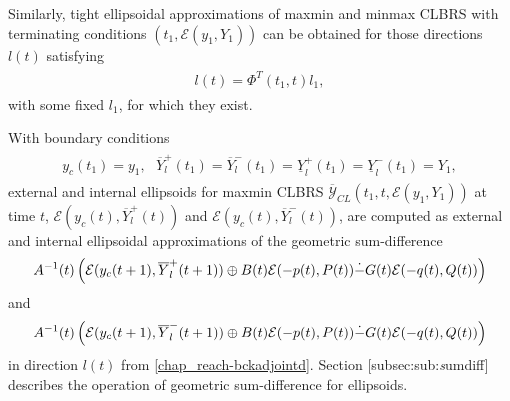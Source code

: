 \documentclass[letterpaper,10pt,english]{sphinxmanual}
\begin{document}
Similarly, tight ellipsoidal approximations of maxmin and minmax CLBRS
with terminating conditions $(t_1, {\mathcal E}(y_1,Y_1))$ can be
obtained for those directions $l(t)$ satisfying
\label{chap_reach:equation-bckadjointd}\begin{gather}
\begin{split}l(t) = \Phi^T(t_1,t)l_1,\end{split}\label{chap_reach-bckadjointd}
\end{gather}
with some fixed $l_1$, for which they exist.

With boundary conditions
\label{chap_reach:equation-bndconds}\begin{gather}
\begin{split}y_c(t_1)=y_1, ~~~ \overline{Y}^+_l(t_1)=\overline{Y}^-_l(t_1)=\underline{Y}^+_l(t_1)=\underline{Y}^-_l(t_1)=Y_1,\end{split}\label{chap_reach-bndconds}
\end{gather}
external and internal ellipsoids for maxmin CLBRS
$\overline{{\mathcal Y}}_{CL}(t_1,t,{\mathcal E}(y_1,Y_1))$ at
time $t$, ${\mathcal E}(y_c(t),\overline{Y}^+_l(t))$ and
${\mathcal E}(y_c(t),\overline{Y}^-_l(t))$, are computed as
external and internal ellipsoidal approximations of the geometric
sum-difference
\begin{gather}
\begin{split}A^{-1}(t)\left(
{\mathcal E}(y_c(t+1),\overline{Y}^+_l(t+1)) \oplus B(t){\mathcal E}(-p(t),P(t))
\dot{-}G(t){\mathcal E}(-q(t),Q(t))
\right)\end{split}\notag
\end{gather}
and
\begin{gather}
\begin{split}A^{-1}(t)\left(
{\mathcal E}(y_c(t+1),\overline{Y}^-_l(t+1)) \oplus B(t){\mathcal E}(-p(t),P(t))
\dot{-}G(t){\mathcal E}(-q(t),Q(t))
\right)\end{split}\notag
\end{gather}
in direction $l(t)$ from \eqref{chap_reach-bckadjointd}. Section
{[}subsec:sub:\emph{s}umdiff{]} describes the operation of geometric
sum-difference for ellipsoids.
\end{document}
